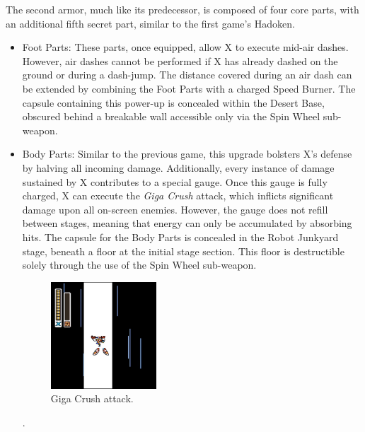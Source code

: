 The second armor, much like its predecessor, is composed of four core parts, with an additional fifth secret part, similar to the first game's Hadoken.
\begin{itemize}
\item Foot Parts: These parts, once equipped, allow X to execute mid-air dashes. However, air dashes cannot be performed if X has already dashed on the ground or during a dash-jump. The distance covered during an air dash can be extended by combining the Foot Parts with a charged Speed Burner. The capsule containing this power-up is concealed within the Desert Base, obscured behind a breakable wall accessible only via the Spin Wheel sub-weapon.

\item Body Parts: Similar to the previous game, this upgrade bolsters X's defense by halving all incoming damage. Additionally, every instance of damage sustained by X contributes to a special gauge. Once this gauge is fully charged, X can execute the \textit{Giga Crush} attack, which inflicts significant damage upon all on-screen enemies. However, the gauge does not refill between stages, meaning that energy can only be accumulated by absorbing hits. The capsule for the Body Parts is concealed in the Robot Junkyard stage, beneath a floor at the initial stage section. This floor is destructible solely through the use of the Spin Wheel sub-weapon.
\begin{figure}
	\centering
	\includegraphics[height=4cm]{figures/X2/weapons/G_crush_1.png}
	\caption{Giga Crush attack.}
\end{figure}.


\end{itemize}
